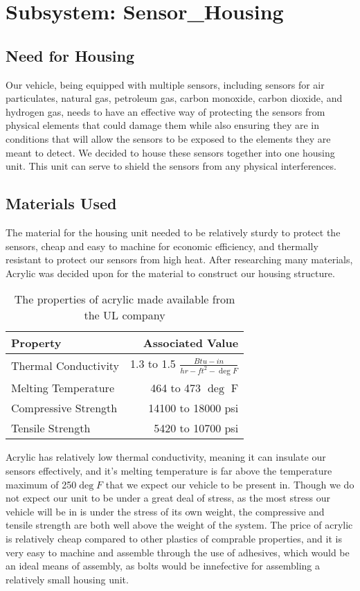 \chapter{Subsystem: Sensor\_Housing}

\section{Need for Housing} Our vehicle, being equipped with multiple sensors, including sensors for air particulates, natural gas, petroleum gas, carbon monoxide, carbon dioxide, and hydrogen gas, needs to have an effective way of protecting the sensors from physical elements that could damage them while also ensuring they are in conditions that will allow the sensors to be exposed to the elements they are meant to detect. We decided to house these sensors together into one housing unit. This unit can serve to shield the sensors from any physical interferences.

\section{Materials Used} The material for the housing unit needed to be relatively sturdy to protect the sensors, cheap and easy to machine for economic efficiency, and thermally resistant to protect our sensors from high heat. After researching many materials, Acrylic was decided upon for the material to construct our housing structure.

\begin{table}
\centering
\begin{tabular}{l|r}
Property & Associated Value \\\hline
Thermal Conductivity & 1.3 to 1.5 $\frac{Btu-in}{hr-ft^2-\deg F}$ \\
Melting Temperature & 464 to 473 $\deg$ F \\
Compressive Strength & 14100 to 18000 psi \\
Tensile Strength & 5420 to 10700 psi \\
\end{tabular}
\caption{\label{tab:Acrylic Properties} The properties of acrylic made available from the UL company \cite{UL}}
\end{table}

Acrylic has relatively low thermal conductivity, meaning it can insulate our sensors effectively, and it's melting temperature is far above the temperature maximum of 250$\deg F$ that we expect our vehicle to be present in. Though we do not expect our unit to be under a great deal of stress, as the most stress our vehicle will be in is under the stress of its own weight, the compressive and tensile strength are both well above the weight of the system. The price of acrylic is relatively cheap compared to other plastics of comprable properties, and it is very easy to machine and assemble through the use of adhesives, which would be an ideal means of assembly, as bolts would be innefective for assembling a relatively small housing unit.

